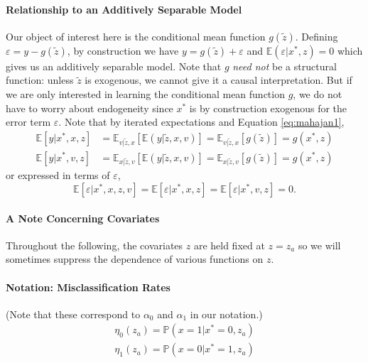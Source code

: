 \documentclass[12pt]{article}
\begin{document}
\paragraph{Relationship to an Additively Separable Model}
Our object of interest here is the conditional mean function $g(\widetilde{z})$.
Defining $\varepsilon = y - g(\widetilde{z})$, by construction we have $y = g(\widetilde{z}) + \varepsilon$ and $\mathbb{E}(\varepsilon|x^*,z)= 0$ which gives us an additively separable model.
Note that $g$ \emph{need not} be a structural function: unless $\widetilde{z}$ is exogenous, we cannot give it a causal interpretation.
But if we are only interested in learning the conditional mean function $g$, we do not have to worry about endogeneity since $x^*$ is by construction exogenous for the error term $\varepsilon$.
Note that by iterated expectations and Equation \ref{eq:mahajan1},
\begin{align*}
  \mathbb{E}[y|x^*,x,z]  &= 
  \mathbb{E}_{v|\widetilde{z},x}\left[\mathbb{E}\left( y|\widetilde{z},x,v \right)  \right]
  = \mathbb{E}_{v|\widetilde{z},x}\left[ g(\widetilde{z}) \right] = g(x^*,z)\\
  \mathbb{E}[y|x^*,v,z]  &= 
  \mathbb{E}_{x|\widetilde{z},v}\left[\mathbb{E}\left( y|\widetilde{z},x,v \right)  \right]
  = \mathbb{E}_{x|\widetilde{z},v}\left[ g(\widetilde{z}) \right] = g(x^*,z)
\end{align*}
or expressed in terms of $\varepsilon$,
\[
  \mathbb{E}[\varepsilon|x^*,x,z,v] = \mathbb{E}[\varepsilon|x^*,x,z] = \mathbb{E}[\varepsilon|x^*,v,z] = 0.
\]

\paragraph{A Note Concerning Covariates}
Throughout the following, the covariates $z$ are held fixed at $z = z_a$ so we will sometimes suppress the dependence of various functions on $z$.

\paragraph{Notation: Misclassification Rates}
(Note that these correspond to $\alpha_0$ and $\alpha_1$ in our notation.)
\begin{align*}
  \eta_0(z_a) = \mathbb{P}(x=1|x^*=0,z_a)\\
  \eta_1(z_a) = \mathbb{P}(x=0|x^*=1,z_a)\\
\end{align*}
\end{document}
